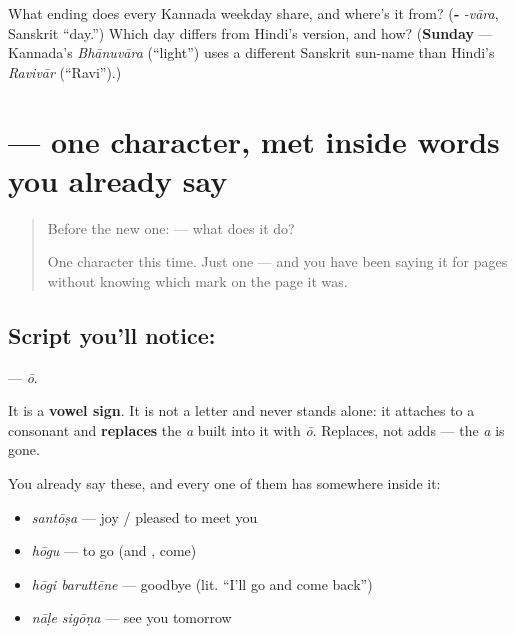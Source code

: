 \begin{tcolorbox}[breakable,colback=teal!4,colframe=teal!35!black,title={Before you move on}]
What ending does every Kannada weekday share, and where's it from? (\textbf{‑} \emph{-vāra}, Sanskrit \textquotedblleft{}day.\textquotedblright{}) Which day differs from Hindi's version, and how? (\textbf{Sunday} — Kannada's \emph{Bhānuvāra} (\textquotedblleft{}light\textquotedblright{}) uses a different Sanskrit sun-name than Hindi's \emph{Ravivār} (\textquotedblleft{}Ravi\textquotedblright{}).)
\end{tcolorbox}
\section[\texorpdfstring{\kn{ೋ} (ō)}{ೋ (ō)}]{ — one character, met inside words you already say}

\label{lesson:KA-S119-vowel-sign-oo}



\begin{quote}
Before the new one:  — what does it do?

One character this time. Just one — and you have been saying it for pages without knowing which mark on the page it was.
\end{quote}

\subsection*{Script you'll notice: }
\textbf{} — \emph{ō}.

It is a \textbf{vowel sign}. It is not a letter and never stands alone: it attaches to a consonant and \textbf{replaces} the \emph{a} built into it with \emph{ō}. Replaces, not adds — the \emph{a} is gone.

You already say these, and every one of them has  somewhere inside it:

\begin{itemize}
\raggedright
  \item \textbf{} \emph{santōṣa} — joy / pleased to meet you
  \item \textbf{} \emph{hōgu} — to go (and , come)
  \item \textbf{ } \emph{hōgi baruttēne} — goodbye (lit. \textquotedblleft{}I'll go and come back\textquotedblright{})
  \item \textbf{ } \emph{nāḷe sigōṇa} — see you tomorrow
\end{itemize}

